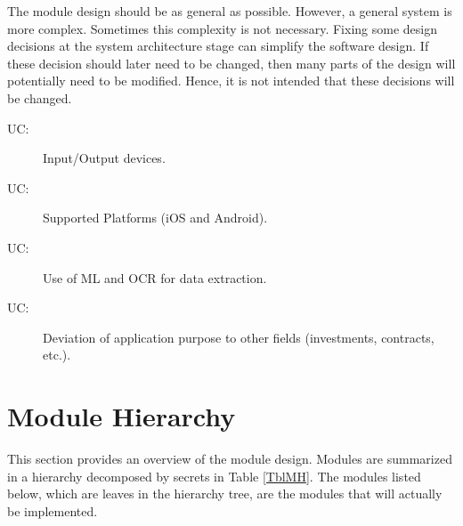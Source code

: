 \documentclass[12pt, titlepage]{article}
\newcounter{ucnum}
\newcommand{\uctheucnum}{UC\theucnum}
\begin{document}
The module design should be as general as possible. However, a general system is
more complex. Sometimes this complexity is not necessary. Fixing some design
decisions at the system architecture stage can simplify the software design. If
these decision should later need to be changed, then many parts of the design
will potentially need to be modified. Hence, it is not intended that these
decisions will be changed.


\begin{description}
  \item[ \uctheucnum \label{ucIO}:] Input/Output devices.
  \item[ \uctheucnum \label{ucPlatforms}:] Supported Platforms (iOS and Android).
  \item[ \uctheucnum \label{ucDataExtraction}:] Use of ML and OCR for data extraction.
  \item[ \uctheucnum \label{ucAppPurpose}:] Deviation of application purpose to other fields (investments, contracts, etc.).
  \end{description}

\section{Module Hierarchy} \label{SecMH}

This section provides an overview of the module design. Modules are summarized
in a hierarchy decomposed by secrets in Table \ref{TblMH}. The modules listed
below, which are leaves in the hierarchy tree, are the modules that will
actually be implemented.
\end{document}
